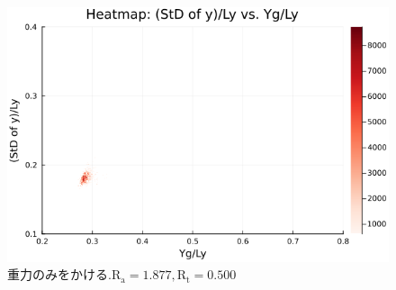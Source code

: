 \begin{figure}[H]
  \centering
  \includegraphics[scale=0.6]{image/dT0_heat/2024-01-15T14:30:48.499_mapg0_chi0_Ay50_rho0.4_T0.43_dT0.0_Rd0.0_Rt0.5_Ra1.877538_g0.0003999718779659611_run4.0e7.png}
  \caption{$重力のみをかける. \text{R}_\text{a}=1.877,\text{R}_\text{t}=0.500$}
  \label{}
\end{figure} 



